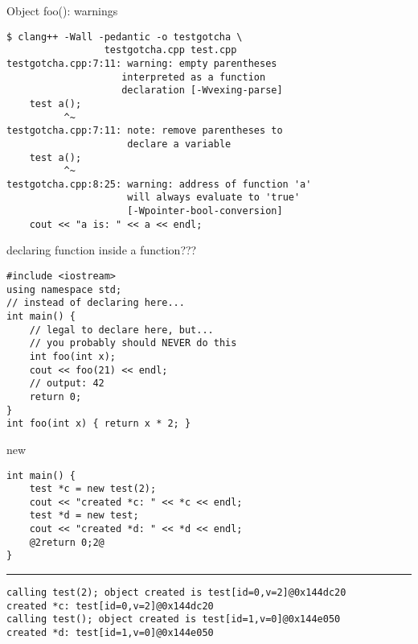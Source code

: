 \begin{frame}[fragile,label=gotchaWarnings]{Object foo(): warnings}
\begin{lstlisting}
$ clang++ -Wall -pedantic -o testgotcha \
                 testgotcha.cpp test.cpp
testgotcha.cpp:7:11: warning: empty parentheses
                    interpreted as a function
                    declaration [-Wvexing-parse]
    test a();
          ^~
testgotcha.cpp:7:11: note: remove parentheses to
                     declare a variable
    test a();
          ^~
testgotcha.cpp:8:25: warning: address of function 'a'
                     will always evaluate to 'true'
                     [-Wpointer-bool-conversion]
    cout << "a is: " << a << endl;
\end{lstlisting}
\end{frame}

\begin{frame}[fragile,label=funcInFuncQ]{declaring function inside a function???}
\begin{lstlisting}
#include <iostream>
using namespace std;
// instead of declaring here...
int main() {
    // legal to declare here, but...
    // you probably should NEVER do this
    int foo(int x);
    cout << foo(21) << endl;
    // output: 42
    return 0;
}
int foo(int x) { return x * 2; }
\end{lstlisting}
\end{frame}

\begin{frame}[fragile,label=testnew]{new}
\begin{lstlisting}
int main() {
    test *c = new test(2);
    cout << "created *c: " << *c << endl;
    test *d = new test;
    cout << "created *d: " << *d << endl;
    @2return 0;2@
}
\end{lstlisting}
\hrule
{}
\begin{lstlisting}
calling test(2); object created is test[id=0,v=2]@0x144dc20
created *c: test[id=0,v=2]@0x144dc20
calling test(); object created is test[id=1,v=0]@0x144e050
created *d: test[id=1,v=0]@0x144e050
\end{lstlisting}
\end{frame}

